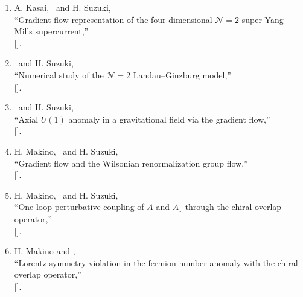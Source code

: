 \begin{enumerate}
       .
 \item A. Kasai, \OM\ and H. Suzuki,\\
       ``Gradient flow representation of the four-dimensional $\mathcal{N}=2$ super Yang--Mills supercurrent,''\\
       [].
 \item \OM\ and H. Suzuki,\\
       ``Numerical study of the $\mathcal{N}=2$ Landau--Ginzburg model,''\\
       [].
 \item \OM\ and H. Suzuki,\\
       ``Axial $U(1)$ anomaly in a gravitational field via the gradient flow,''\\
       [].
 \item H. Makino, \OM\ and H. Suzuki,\\
       ``Gradient flow and the Wilsonian renormalization group flow,''\\
       [].
 \item H. Makino, \OM\ and H. Suzuki,\\
       ``One-loop perturbative coupling of $A$ and $A_\star$ through the chiral overlap operator,''\\
       [].
 \item H. Makino and \OM,\\
       ``Lorentz symmetry violation in the fermion number anomaly with the chiral overlap operator,''\\
       [].
\end{enumerate}

